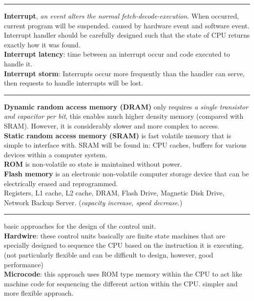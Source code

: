 \documentclass[8pt,a4paper,landscape]{article}
\begin{document}
\begin{spacing}{-1}
\begin{multicols*}{3}
    \hrule \noindent
    \textbf{Interrupt}, \textit{an event alters the normal fetch-decode-execution}. When occurred, current program will be suspended. caused by hardware event and software event. \\
    Interrupt handler should be carefully designed such that the state of CPU returns exactly how it was found. \\
    \textbf{Interrupt latency}: time between an interrupt occur and code executed to handle it. \\
    \textbf{Interrupt storm}: Interrupts occur more frequently than the handler can serve, then requests to handle interrupts will be lost.

    \hrule \noindent
    \textbf{Dynamic random access memory (DRAM)} only requires \textit{a single transistor and capacitor per bit}, this enables much higher density memory (compared with SRAM). However, it is considerably slower and more complex to access. \\
    \textbf{Static random access memory (SRAM)} is fast volatile memory that is simple to interface with. SRAM will be found in: CPU caches, buffers for various devices within a computer system. \\
    \textbf{ROM} is non-volatile so state is maintained without power. \\
    \textbf{Flash memory} is an electronic non-volatile computer storage device that can be electrically erased and reprogrammed. \\
Registers, L1 cache, L2 cache, DRAM, Flash Drive, Magnetic Disk Drive, Network Backup Server. 
    (\textit{capacity increase, speed decrease}.)

\hrule {} basic approaches for the design of the control unit. \\
\textbf{Hardwire}: these control units basically are finite state machines that are specially designed to sequence the CPU based on the instruction it is executing. (not particularly flexible and can be difficult to design, however, good performance) \\
\textbf{Microcode}: this approach uses ROM type memory within the CPU to act like machine code for sequencing the different action within the CPU. simpler and more flexible approach. \\


\end{multicols*}
\end{spacing}
\end{document}
